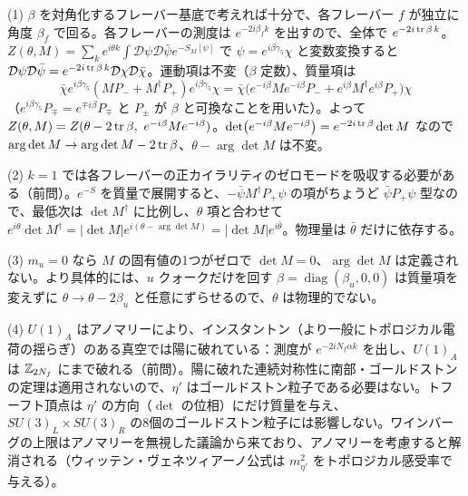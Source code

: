 \begin{solution}
(1) $\beta$ を対角化するフレーバー基底で考えれば十分で、各フレーバー $f$ が独立に角度 $\beta_f$ で回る。各フレーバーの測度は $e^{-2i\beta_fk}$ を出すので、全体で $e^{-2i\tr\beta\,k}$。$Z(\theta,M)=\sum_ke^{i\theta k}\int\mathcal D\psi\mathcal D\bar\psi e^{-S_M[\psi]}$ で $\psi=e^{i\beta\gamma_5}\chi$ と変数変換すると $\mathcal D\psi\mathcal D\bar\psi=e^{-2i\tr\beta\,k}\mathcal D\chi\mathcal D\bar\chi$。運動項は不変（$\beta$ 定数）、質量項は
\[
\bar\chi e^{i\beta\gamma_5}(MP_-+M^\dagger P_+)e^{i\beta\gamma_5}\chi=\bar\chi\bigl(e^{-i\beta}Me^{-i\beta}P_-+e^{i\beta}M^\dagger e^{i\beta}P_+\bigr)\chi
\]
（$e^{i\beta\gamma_5}P_\mp=e^{\mp i\beta}P_\mp$ と $P_\pm$ が $\beta$ と可換なことを用いた）。よって $Z(\theta,M)=Z(\theta-2\tr\beta,\ e^{-i\beta}Me^{-i\beta})$。$\det(e^{-i\beta}Me^{-i\beta})=e^{-2i\tr\beta}\det M$ なので $\arg\det M\to\arg\det M-2\tr\beta$、$\theta-\arg\det M$ は不変。

(2) $k=1$ では各フレーバーの正カイラリティのゼロモードを吸収する必要がある（前問）。$e^{-S}$ を質量で展開すると、$-\bar\psi M^\dagger P_+\psi$ の項がちょうど $\bar\psi P_+\psi$ 型なので、最低次は $\det M^\dagger$ に比例し、$\theta$ 項と合わせて $e^{i\theta}\det M^\dagger=\lvert\det M\rvert e^{i(\theta-\arg\det M)}=\lvert\det M\rvert e^{i\bar\theta}$。物理量は $\bar\theta$ だけに依存する。

(3) $m_u=0$ なら $M$ の固有値の1つがゼロで $\det M=0$、$\arg\det M$ は定義されない。より具体的には、$u$ クォークだけを回す $\beta=\operatorname{diag}(\beta_u,0,0)$ は質量項を変えずに $\theta\to\theta-2\beta_u$ と任意にずらせるので、$\theta$ は物理的でない。

(4) $U(1)_A$ はアノマリーにより、インスタントン（より一般にトポロジカル電荷の揺らぎ）のある真空では陽に破れている：測度が $e^{-2iN_f\alpha k}$ を出し、$U(1)_A$ は $\mathbb{Z}_{2N_f}$ にまで破れる（前問）。陽に破れた連続対称性に南部・ゴールドストンの定理は適用されないので、$\eta'$ はゴールドストン粒子である必要はない。トフーフト頂点は $\eta'$ の方向（$\det$ の位相）にだけ質量を与え、$SU(3)_L\times SU(3)_R$ の8個のゴールドストン粒子には影響しない。ワインバーグの上限はアノマリーを無視した議論から来ており、アノマリーを考慮すると解消される（ウィッテン・ヴェネツィアーノ公式は $m_{\eta'}^2$ をトポロジカル感受率で与える）。
\end{solution}

